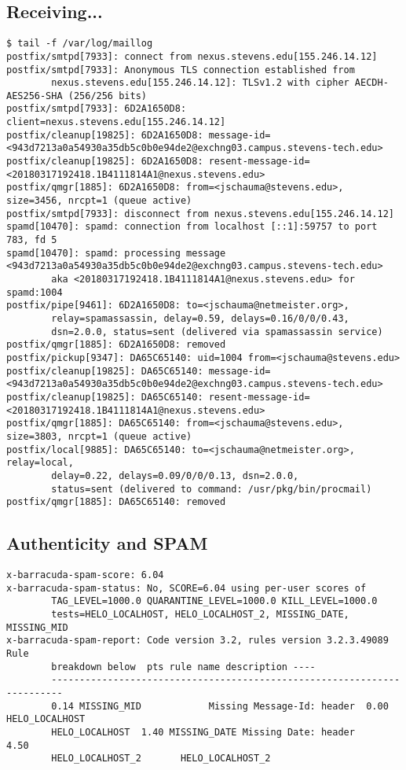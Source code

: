 \documentclass[xga]{xdvislides}
\begin{document}
\subsection{Receiving...}
\smallish
\begin{verbatim}
$ tail -f /var/log/maillog
postfix/smtpd[7933]: connect from nexus.stevens.edu[155.246.14.12]
postfix/smtpd[7933]: Anonymous TLS connection established from
        nexus.stevens.edu[155.246.14.12]: TLSv1.2 with cipher AECDH-AES256-SHA (256/256 bits)
postfix/smtpd[7933]: 6D2A1650D8: client=nexus.stevens.edu[155.246.14.12]
postfix/cleanup[19825]: 6D2A1650D8: message-id=<943d7213a0a54930a35db5c0b0e94de2@exchng03.campus.stevens-tech.edu>
postfix/cleanup[19825]: 6D2A1650D8: resent-message-id=<20180317192418.1B4111814A1@nexus.stevens.edu>
postfix/qmgr[1885]: 6D2A1650D8: from=<jschauma@stevens.edu>, size=3456, nrcpt=1 (queue active)
postfix/smtpd[7933]: disconnect from nexus.stevens.edu[155.246.14.12]
spamd[10470]: spamd: connection from localhost [::1]:59757 to port 783, fd 5
spamd[10470]: spamd: processing message <943d7213a0a54930a35db5c0b0e94de2@exchng03.campus.stevens-tech.edu>
        aka <20180317192418.1B4111814A1@nexus.stevens.edu> for spamd:1004
postfix/pipe[9461]: 6D2A1650D8: to=<jschauma@netmeister.org>,
        relay=spamassassin, delay=0.59, delays=0.16/0/0/0.43,
        dsn=2.0.0, status=sent (delivered via spamassassin service)
postfix/qmgr[1885]: 6D2A1650D8: removed
postfix/pickup[9347]: DA65C65140: uid=1004 from=<jschauma@stevens.edu>
postfix/cleanup[19825]: DA65C65140: message-id=<943d7213a0a54930a35db5c0b0e94de2@exchng03.campus.stevens-tech.edu>
postfix/cleanup[19825]: DA65C65140: resent-message-id=<20180317192418.1B4111814A1@nexus.stevens.edu>
postfix/qmgr[1885]: DA65C65140: from=<jschauma@stevens.edu>, size=3803, nrcpt=1 (queue active)
postfix/local[9885]: DA65C65140: to=<jschauma@netmeister.org>, relay=local,
        delay=0.22, delays=0.09/0/0/0.13, dsn=2.0.0,
        status=sent (delivered to command: /usr/pkg/bin/procmail)
postfix/qmgr[1885]: DA65C65140: removed
\end{verbatim}
\Normalsize


\subsection{Authenticity and SPAM}
\begin{verbatim}
x-barracuda-spam-score: 6.04
x-barracuda-spam-status: No, SCORE=6.04 using per-user scores of
        TAG_LEVEL=1000.0 QUARANTINE_LEVEL=1000.0 KILL_LEVEL=1000.0
        tests=HELO_LOCALHOST, HELO_LOCALHOST_2, MISSING_DATE, MISSING_MID
x-barracuda-spam-report: Code version 3.2, rules version 3.2.3.49089    Rule
        breakdown below  pts rule name description ----
        ------------------------------------------------------------------------
        0.14 MISSING_MID            Missing Message-Id: header  0.00 HELO_LOCALHOST
        HELO_LOCALHOST  1.40 MISSING_DATE Missing Date: header        4.50
        HELO_LOCALHOST_2       HELO_LOCALHOST_2
\end{verbatim}
\end{document}
